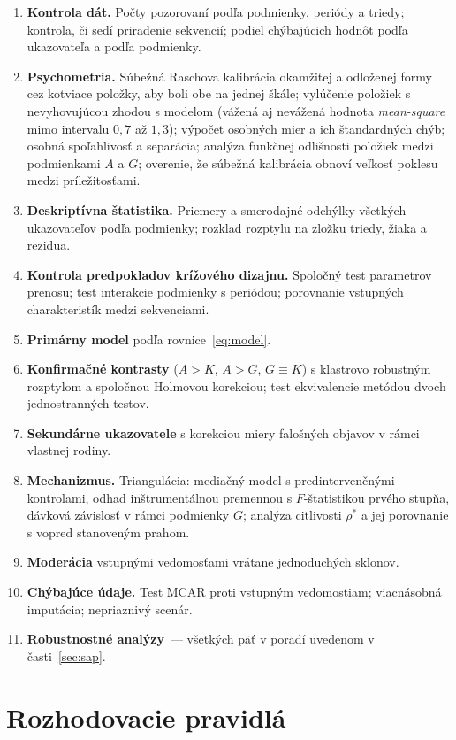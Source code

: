 \begin{enumerate}[nosep]
    \item \textbf{Kontrola dát.} Počty pozorovaní podľa podmienky, periódy a triedy; kontrola, či sedí priradenie sekvencií; podiel chýbajúcich hodnôt podľa ukazovateľa a podľa podmienky.
    \item \textbf{Psychometria.} Súbežná Raschova kalibrácia okamžitej a odloženej formy cez kotviace položky, aby boli obe na jednej škále; vylúčenie položiek s nevyhovujúcou zhodou s modelom (vážená aj nevážená hodnota \emph{mean-square} mimo intervalu $0{,}7$ až $1{,}3$); výpočet osobných mier a ich štandardných chýb; osobná spoľahlivosť a separácia; analýza funkčnej odlišnosti položiek medzi podmienkami $A$ a $G$; overenie, že súbežná kalibrácia obnoví veľkosť poklesu medzi príležitosťami.
    \item \textbf{Deskriptívna štatistika.} Priemery a smerodajné odchýlky všetkých ukazovateľov podľa podmienky; rozklad rozptylu na zložku triedy, žiaka a rezidua.
    \item \textbf{Kontrola predpokladov krížového dizajnu.} Spoločný test parametrov prenosu; test interakcie podmienky s periódou; porovnanie vstupných charakteristík medzi sekvenciami.
    \item \textbf{Primárny model} podľa rovnice~\eqref{eq:model}.
    \item \textbf{Konfirmačné kontrasty} ($A>K$, $A>G$, $G\equiv K$) s klastrovo robustným rozptylom a spoločnou Holmovou korekciou; test ekvivalencie metódou dvoch jednostranných testov.
    \item \textbf{Sekundárne ukazovatele} s korekciou miery falošných objavov v rámci vlastnej rodiny.
    \item \textbf{Mechanizmus.} Triangulácia: mediačný model s predintervenčnými kontrolami, odhad inštrumentálnou premennou s $F$-štatistikou prvého stupňa, dávková závislosť v rámci podmienky $G$; analýza citlivosti $\rho^\ast$ a jej porovnanie s vopred stanoveným prahom.
    \item \textbf{Moderácia} vstupnými vedomosťami vrátane jednoduchých sklonov.
    \item \textbf{Chýbajúce údaje.} Test MCAR proti vstupným vedomostiam; viacnásobná imputácia; nepriaznivý scenár.
    \item \textbf{Robustnostné analýzy}~--- všetkých päť v poradí uvedenom v časti~\ref{sec:sap}.
\end{enumerate}

\section{Rozhodovacie pravidlá}

